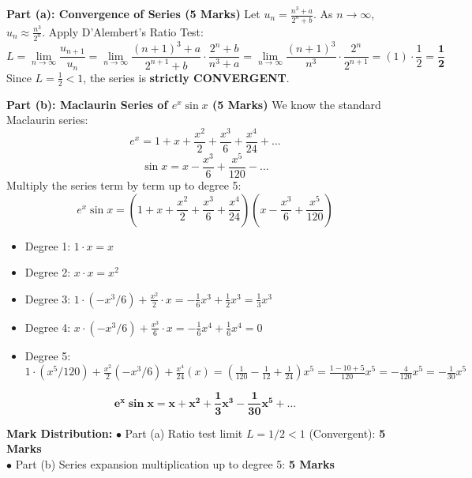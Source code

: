\begin{solutionbox}
\textbf{Part (a): Convergence of Series (5 Marks)}
Let $u_n = \frac{n^3 + a}{2^n + b}$. As $n \to \infty$, $u_n \approx \frac{n^3}{2^n}$.
Apply D'Alembert's Ratio Test:
\[
L = \lim_{n\to\infty} \frac{u_{n+1}}{u_n} = \lim_{n\to\infty} \frac{(n+1)^3 + a}{2^{n+1} + b} \cdot \frac{2^n + b}{n^3 + a} = \lim_{n\to\infty} \frac{(n+1)^3}{n^3} \cdot \frac{2^n}{2^{n+1}} = (1) \cdot \frac{1}{2} = \mathbf{\frac{1}{2}}
\]
Since $L = \frac{1}{2} < 1$, the series is \textbf{strictly CONVERGENT}.

\textbf{Part (b): Maclaurin Series of $e^x \sin x$ (5 Marks)}
We know the standard Maclaurin series:
\[
e^x = 1 + x + \frac{x^2}{2} + \frac{x^3}{6} + \frac{x^4}{24} + \dots
\]
\[
\sin x = x - \frac{x^3}{6} + \frac{x^5}{120} - \dots
\]
Multiply the series term by term up to degree 5:
\[
e^x \sin x = \left(1 + x + \frac{x^2}{2} + \frac{x^3}{6} + \frac{x^4}{24}\right) \left(x - \frac{x^3}{6} + \frac{x^5}{120}\right)
\]
\begin{itemize}[leftmargin=6mm]
    \item Degree 1: $1 \cdot x = x$
    \item Degree 2: $x \cdot x = x^2$
    \item Degree 3: $1 \cdot (-x^3/6) + \frac{x^2}{2} \cdot x = -\frac{1}{6}x^3 + \frac{1}{2}x^3 = \frac{1}{3}x^3$
    \item Degree 4: $x \cdot (-x^3/6) + \frac{x^3}{6} \cdot x = -\frac{1}{6}x^4 + \frac{1}{6}x^4 = 0$
    \item Degree 5: $1 \cdot (x^5/120) + \frac{x^2}{2}(-x^3/6) + \frac{x^4}{24}(x) = \left(\frac{1}{120} - \frac{1}{12} + \frac{1}{24}\right)x^5 = \frac{1 - 10 + 5}{120}x^5 = -\frac{4}{120}x^5 = -\frac{1}{30}x^5$
\end{itemize}
\[
\mathbf{e^x \sin x = x + x^2 + \frac{1}{3}x^3 - \frac{1}{30}x^5 + \dots}
\]

\begin{markingrubric}
\textbf{Mark Distribution:}
$\bullet$ Part (a) Ratio test limit $L = 1/2 < 1$ (Convergent): \textbf{5 Marks}\\
$\bullet$ Part (b) Series expansion multiplication up to degree 5: \textbf{5 Marks}
\end{markingrubric}
\end{solutionbox}

